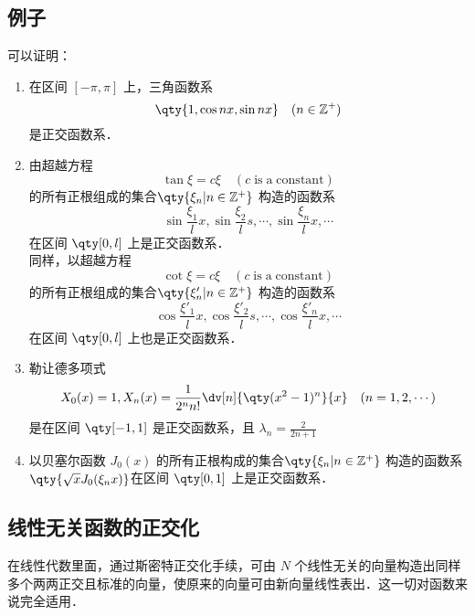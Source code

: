\subsection{例子}
可以证明：
\begin{enumerate}
\item 在区间 $[-\pi,\pi]$ 上，三角函数系
\begin{equation}
\qty{1,\cos nx,\sin nx}\quad(n\in \mathbb{Z^{+}})
\end{equation}
是正交函数系．
\item 由超越方程
\begin{equation}
\tan\xi=c\xi \quad(c\; \mathrm{is\; a\; constant})
\end{equation}
 的所有正根组成的集合$\qty{\xi_n\vert n\in\mathbb{Z}^+}$
 构造的函数系
 \begin{equation}
 \sin\frac{\xi_1}{l}x,\sin\frac{\xi_2}{l}s,\cdots,\sin\frac{\xi_n}{l}x,\cdots
 \end{equation}
 在区间 $\qty[0,l]$ 上是正交函数系．\\
 
 同样，以超越方程
\begin{equation}
\cot\xi=c\xi \quad(c\; \mathrm{is\; a\; constant})
\end{equation}
 的所有正根组成的集合$\qty{\xi'_n\vert n\in\mathbb{Z}^+}$
 构造的函数系
 \begin{equation}
 \cos\frac{\xi'_1}{l}x,\cos\frac{\xi'_2}{l}s,\cdots,\cos\frac{\xi'_n}{l}x,\cdots
 \end{equation}
 在区间 $\qty[0,l]$ 上也是正交函数系．
 \item 勒让德多项式
\begin{equation}
X_0(x)=1,X_n(x)=\frac{1}{2^nn!}\dv[n]{\qty(x^2-1)^n}{x}\quad(n=1,2,\cdots)
\end{equation}
是在区间 $\qty[-1,1]$ 是正交函数系，且 $\lambda_n=\frac{2}{2n+1}$
\item 以贝塞尔函数 $J_0(x)$ 的所有正根构成的集合$\qty{\xi_n\vert n\in\mathbb{Z}^+}$
构造的函数系$\qty{\sqrt{x}J_0(\xi_n x)} $在区间 $\qty[0,1]$ 上是正交函数系．
\end{enumerate}

\subsection{线性无关函数的正交化}
在线性代数里面，通过斯密特正交化手续，可由 $N$ 个线性无关的向量构造出同样多个两两正交且标准的向量，使原来的向量可由新向量线性表出．这一切对函数来说完全适用．

